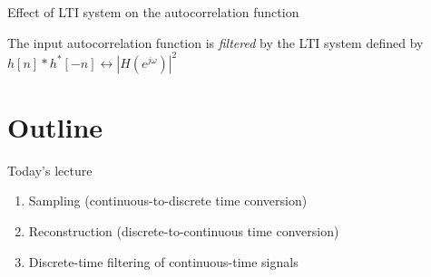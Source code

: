 \documentclass[10pt]{beamer}
\begin{document}
\begin{frame}{Effect of LTI system on the autocorrelation function}
\begin{center}
	\resizebox{0.8\linewidth}{!}{}
\end{center}

The input autocorrelation function is \textit{filtered} by the LTI system defined by $h[n]\ast h^*[-n] \leftrightarrow |H(e^{j\omega})|^2$ 

\end{frame}

%
\section{Outline}
\begin{frame}{Today's lecture} 

\begin{enumerate}
	\item Sampling (continuous-to-discrete time conversion)
	\item Reconstruction (discrete-to-continuous time conversion)
	\item Discrete-time filtering of continuous-time signals
\end{enumerate}

\end{frame}

%
\end{document}
